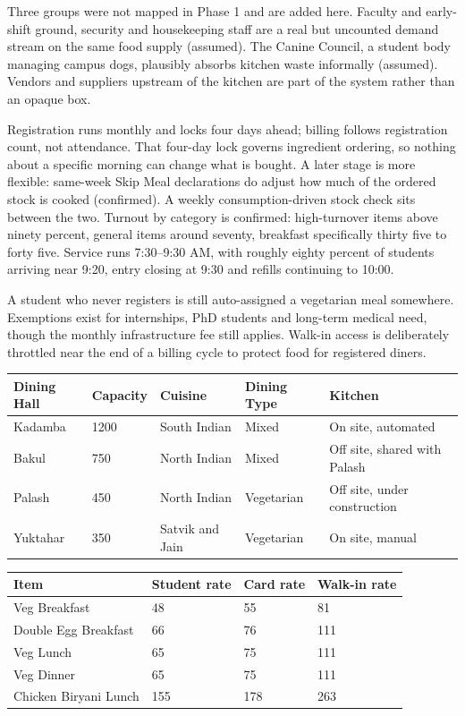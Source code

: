 \documentclass[11pt]{article}
\begin{document}
Three groups were not mapped in Phase 1 and are added here. Faculty and early-shift ground,
security and housekeeping staff are a real but uncounted demand stream on the same food supply
(assumed). The Canine Council, a student body managing campus dogs, plausibly absorbs kitchen waste
informally (assumed). Vendors and suppliers upstream of the kitchen are part of the system rather
than an opaque box.

Registration runs monthly and locks four days ahead; billing follows registration count, not
attendance. That four-day lock governs ingredient ordering, so nothing about a specific morning can
change what is bought. A later stage is more flexible: same-week Skip Meal declarations do adjust
how much of the ordered stock is cooked (confirmed). A weekly consumption-driven stock check sits
between the two. Turnout by category is confirmed: high-turnover items above ninety percent,
general items around seventy, breakfast specifically thirty five to forty five. Service runs
7:30--9:30 AM, with roughly eighty percent of students arriving near 9:20, entry closing at 9:30
and refills continuing to 10:00.

A student who never registers is still auto-assigned a vegetarian meal somewhere. Exemptions exist
for internships, PhD students and long-term medical need, though the monthly infrastructure fee
still applies. Walk-in access is deliberately throttled near the end of a billing cycle to protect
food for registered diners.

{\setlength{\tabcolsep}{4pt}
\begin{longtable}{L{0.15\textwidth}L{0.11\textwidth}L{0.17\textwidth}L{0.15\textwidth}L{0.27\textwidth}}
\toprule
\textbf{Dining Hall} & \textbf{Capacity} & \textbf{Cuisine} & \textbf{Dining Type} & \textbf{Kitchen} \\
\midrule
\endhead
Kadamba & 1200 & South Indian & Mixed & On site, automated \\
Bakul & 750 & North Indian & Mixed & Off site, shared with Palash \\
Palash & 450 & North Indian & Vegetarian & Off site, under construction \\
Yuktahar & 350 & Satvik and Jain & Vegetarian & On site, manual \\
\bottomrule
\end{longtable}}

\begin{longtable}{L{0.34\textwidth}L{0.18\textwidth}L{0.18\textwidth}L{0.18\textwidth}}
\toprule
\textbf{Item} & \textbf{Student rate} & \textbf{Card rate} & \textbf{Walk-in rate} \\
\midrule
\endhead
Veg Breakfast & 48 & 55 & 81 \\
Double Egg Breakfast & 66 & 76 & 111 \\
Veg Lunch & 65 & 75 & 111 \\
Veg Dinner & 65 & 75 & 111 \\
Chicken Biryani Lunch & 155 & 178 & 263 \\
\bottomrule
\end{longtable}
\end{document}
